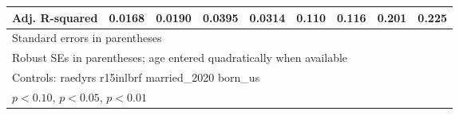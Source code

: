 \begin{table}[htbp]
\begin{tabular}{l*{8}{c}}
Adj. R-squared  &   0.0168         &   0.0190         &   0.0395         &   0.0314         &    0.110         &    0.116         &    0.201         &    0.225         \\
\bottomrule
\multicolumn{9}{l}{\footnotesize Standard errors in parentheses}\\
\multicolumn{9}{l}{\footnotesize Robust SEs in parentheses; age entered quadratically when available}\\
\multicolumn{9}{l}{\footnotesize Controls:  raedyrs r15inlbrf married\_2020 born\_us}\\
\multicolumn{9}{l}{\footnotesize \sym{*} \(p<0.10\), \sym{**} \(p<0.05\), \sym{***} \(p<0.01\)}\\
\end{tabular}
\end{table}
